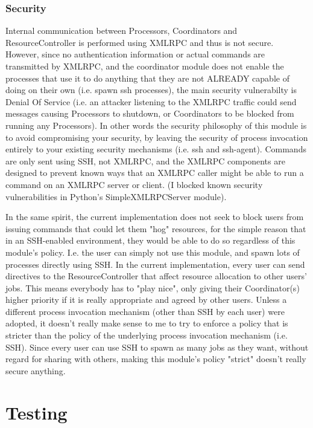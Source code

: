 \documentclass{howto}
\begin{document}
\subsubsection{Security}

Internal communication between Processors, Coordinators and ResourceController is performed using XMLRPC and thus is not secure. However, since no authentication information or actual commands are transmitted by XMLRPC, and the coordinator module does not enable the processes that use it to do anything that they are not ALREADY capable of doing on their own (i.e. spawn ssh processes), the main security vulnerabilty is Denial Of Service (i.e. an attacker listening to the XMLRPC traffic could send messages causing Processors to shutdown, or Coordinators to be blocked from running any Processors).  In other words the security philosophy of this module is to avoid compromising your security, by leaving the security of process invocation entirely to your existing security mechanisms (i.e. ssh and ssh-agent).  Commands are only sent using SSH, not XMLRPC, and the XMLRPC components are designed to prevent known ways that an XMLRPC caller might be able to run a command on an XMLRPC server or client. (I blocked known security vulnerabilities in Python's SimpleXMLRPCServer module).

In the same spirit, the current implementation does not seek to block users from issuing commands that could let them "hog" resources, for the simple reason that in an SSH-enabled environment, they would be able to do so regardless of this module's policy.  I.e. the user can simply not use this module, and spawn lots of processes directly using SSH.  In the current implementation, every user can send directives to the ResourceController that affect resource allocation to other users' jobs.  This means everybody has to "play nice", only giving their Coordinator(s) higher priority if it is really appropriate and agreed by other users.  Unless a different process invocation mechanism (other than SSH by each user) were adopted, it doesn't really make sense to me to try to enforce a policy that is stricter than the policy of the underlying process invocation mechanism (i.e. SSH).  Since every user can use SSH to spawn as many jobs as they want, without regard for sharing with others, making this module's policy "strict" doesn't really secure anything.


\section{Testing}
\label{testing-doc}
\end{document}

